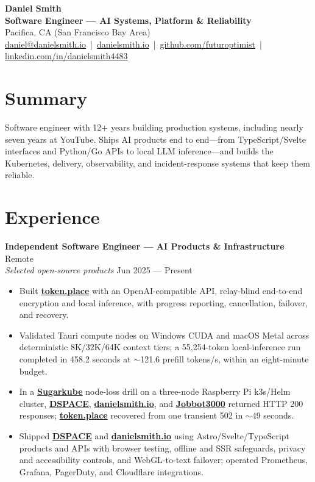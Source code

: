 \documentclass[11pt]{article}
\begin{document}
\begin{center}
  {\LARGE\textbf{Daniel Smith}}\\[0.5mm]
  {\large\textbf{Software Engineer --- AI Systems, Platform \& Reliability}}\\[0.7mm]
  Pacifica, CA (San Francisco Bay Area)\\[0.4mm]
  \href{mailto:daniel@danielsmith.io}{daniel@danielsmith.io} \,|\,
  \href{https://danielsmith.io}{danielsmith.io} \,|\,
  \href{https://github.com/futuroptimist}{github.com/futuroptimist} \,|\,
  \href{https://linkedin.com/in/danielsmith4483}{linkedin.com/in/danielsmith4483}
\end{center}

\vspace{-2.8mm}
\section*{Summary}
Software engineer with 12+ years building production systems, including nearly seven years at
YouTube. Ships AI products end to end---from TypeScript/Svelte interfaces and Python/Go APIs to
local LLM inference---and builds the Kubernetes, delivery, observability, and incident-response
systems that keep them reliable.

\section*{Experience}
\textbf{Independent Software Engineer --- AI Products \& Infrastructure} \hfill Remote\\
\textit{Selected open-source products} \hfill Jun 2025 --- Present
\begin{itemize}
  \item Built \href{https://token.place}{\textbf{token.place}} with an OpenAI-compatible API,
  relay-blind end-to-end encryption and local inference, with progress reporting, cancellation,
  failover, and recovery.
  \item Validated Tauri compute nodes on Windows CUDA and macOS Metal across deterministic
  8K/32K/64K context tiers; a 55,254-token local-inference run completed in 458.2 seconds at
  ${\sim}$121.6 prefill tokens/s, within an eight-minute budget.
  \item In a \href{https://github.com/futuroptimist/sugarkube}{\textbf{Sugarkube}} node-loss drill
  on a three-node Raspberry Pi k3s/Helm cluster,
  \href{https://democratized.space}{\textbf{DSPACE}},
  \href{https://danielsmith.io}{\textbf{danielsmith.io}}, and
  \href{https://github.com/futuroptimist/jobbot3000}{\textbf{Jobbot3000}}
  returned HTTP 200 responses;
  \href{https://token.place}{\textbf{token.place}} recovered from one transient 502 in ${\sim}$49
  seconds.
  \item Shipped \href{https://democratized.space}{\textbf{DSPACE}} and
  \href{https://danielsmith.io}{\textbf{danielsmith.io}} using Astro/Svelte/TypeScript products and
  APIs with browser testing, offline and SSR safeguards, privacy and accessibility controls, and
  WebGL-to-text failover; operated Prometheus, Grafana, PagerDuty, and Cloudflare integrations.
\end{itemize}
\end{document}

